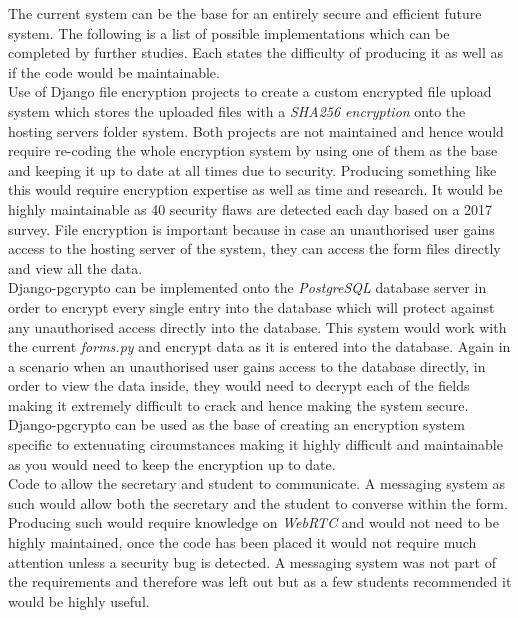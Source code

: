 \documentclass[../main.tex]{subfiles}
\begin{document}
\raggedright
The current system can be the base for an entirely secure and efficient future system. The following is a list of possible implementations which can be completed by further studies. Each states the difficulty of producing it as well as if the code would be maintainable. \\[4mm]

Use of Django file encryption projects\cite{ruddra}\cite{danielquinn} to create a custom encrypted file upload system which stores the uploaded files with a \textit{SHA256 encryption} onto the hosting servers folder system. Both projects are not maintained and hence would require re-coding the whole encryption system by using one of them as the base and keeping it up to date at all times due to security. Producing something like this would require encryption expertise as well as time and research. It would be highly maintainable as 40 security flaws are detected each day based on a 2017 survey\cite{vulner}. File encryption is important because in case an unauthorised user gains access to the hosting server of the system, they can access the form files directly and view all the data. \\[4mm]
  
Django-pgcrypto\cite{dbencrypt} can be implemented onto the \textit{PostgreSQL} database server in order to encrypt every single entry into the database which will protect against any unauthorised access directly into the database. This system would work with the current \textit{forms.py} and encrypt data as it is entered into the database. Again in a scenario when an unauthorised user gains access to the database directly, in order to view the data inside, they would need to decrypt each of the fields making it extremely difficult to crack and hence making the system secure. Django-pgcrypto\cite{dbencrypt} can be used as the base of creating an encryption system specific to extenuating circumstances making it highly difficult and maintainable as you would need to keep the encryption up to date. \\[4mm]
  
Code to allow the secretary and student to communicate. A messaging system as such would allow both the secretary and the student to converse within the form. Producing such would require knowledge on \textit{WebRTC} and would not need to be highly maintained, once the code has been placed it would not require much attention unless a security bug is detected. A messaging system was not part of the requirements and therefore was left out but as a few students recommended it would be highly useful. \\[4mm]
  
\end{document}
